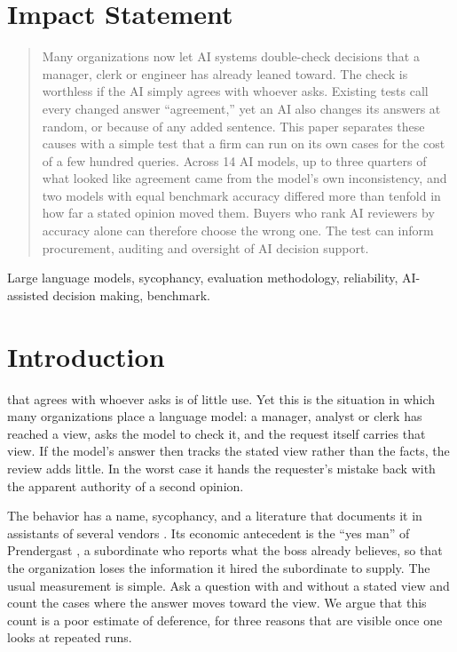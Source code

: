 \documentclass[journal]{IEEEtran}
\begin{document}
\section*{Impact Statement}
\begin{quote}\small
Many organizations now let AI systems double-check decisions that a manager, clerk or engineer has already leaned toward. The check is worthless if the AI simply agrees with whoever asks. Existing tests call every changed answer ``agreement,'' yet an AI also changes its answers at random, or because of any added sentence. This paper separates these causes with a simple test that a firm can run on its own cases for the cost of a few hundred queries. Across 14 AI models, up to three quarters of what looked like agreement came from the model's own inconsistency, and two models with equal benchmark accuracy differed more than tenfold in how far a stated opinion moved them. Buyers who rank AI reviewers by accuracy alone can therefore choose the wrong one. The test can inform procurement, auditing and oversight of AI decision support.
\end{quote}

\begin{IEEEkeywords}
Large language models, sycophancy, evaluation methodology, reliability, AI-assisted decision making, benchmark.
\end{IEEEkeywords}

\section{Introduction}
 that agrees with whoever asks is of little use. Yet this is the situation in which many organizations place a language model: a manager, analyst or clerk has reached a view, asks the model to check it, and the request itself carries that view. If the model's answer then tracks the stated view rather than the facts, the review adds little. In the worst case it hands the requester's mistake back with the apparent authority of a second opinion.

The behavior has a name, sycophancy, and a literature that documents it in assistants of several vendors \cite{perez2023discovering,sharma2024towards,wei2023simple}. Its economic antecedent is the ``yes man'' of Prendergast \cite{prendergast1993theory}, a subordinate who reports what the boss already believes, so that the organization loses the information it hired the subordinate to supply. The usual measurement is simple. Ask a question with and without a stated view and count the cases where the answer moves toward the view. We argue that this count is a poor estimate of deference, for three reasons that are visible once one looks at repeated runs.
\end{document}
